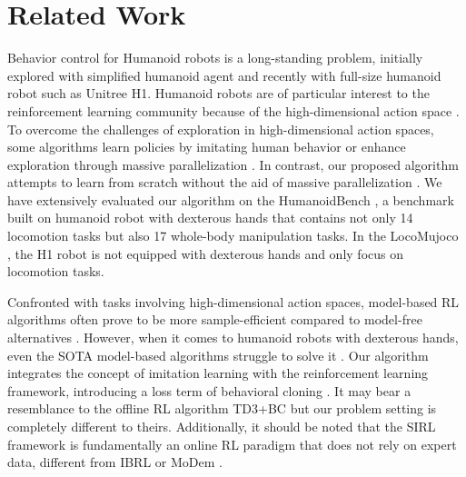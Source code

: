 \section{Related Work}
Behavior control for Humanoid robots is a long-standing problem, initially explored with simplified humanoid agent \citep{tunyasuvunakool2020dm_control} and recently with full-size humanoid robot \citep{zhuang2024humanoid,fu2024humanplus} such as Unitree H1.
Humanoid robots are of particular interest to the reinforcement learning community because of the high-dimensional action space \citep{merel2017learning, hansen2022temporal, hansen2023td, hansen2024hierarchical}.
To overcome the challenges of exploration in high-dimensional action spaces, some algorithms learn policies by imitating human behavior \citep{fu2024humanplus} or enhance exploration through massive parallelization \citep{zhuang2024humanoid}.
In contrast, our proposed algorithm attempts to learn from scratch without the aid of massive parallelization \citep{makoviychuk2021isaac}. 
We have extensively evaluated our algorithm on the HumanoidBench \citep{sferrazza2024humanoidbench}, a benchmark built on humanoid robot with dexterous hands \citep{menagerie2022github} that contains not only  14 locomotion tasks but also  17 whole-body manipulation tasks.
In the LocoMujoco \citep{al2023locomujoco}, the H1 robot is not equipped with dexterous hands and only focus on locomotion tasks.

Confronted with tasks involving high-dimensional action spaces, model-based RL algorithms \citep{ha2018recurrent, hansen2022temporal, hafner2023mastering, hafner2019dream} often prove to be more sample-efficient compared to model-free alternatives \citep{haarnoja2018soft, fujimoto2018addressing}. 
However, when it comes to humanoid robots with dexterous hands, even the SOTA model-based algorithms struggle to solve it \citep{sferrazza2024humanoidbench}. 
Our algorithm integrates the concept of imitation learning \citep{liu2023ceil, zhang2024context} with the reinforcement learning framework, introducing a loss term of behavioral cloning \citep{pomerleau1988alvinn}.  It may bear a  resemblance to the offline RL \citep{zhuang2024reinformer, fujimoto2019off} algorithm TD3+BC \citep{fujimoto2021minimalist} but our problem setting is   completely different to theirs.
Additionally, it should be noted that the SIRL framework is fundamentally an online RL paradigm that does not rely on expert data, different from IBRL \citep{hu2023imitation} or MoDem \citep{hansen2022modem}.